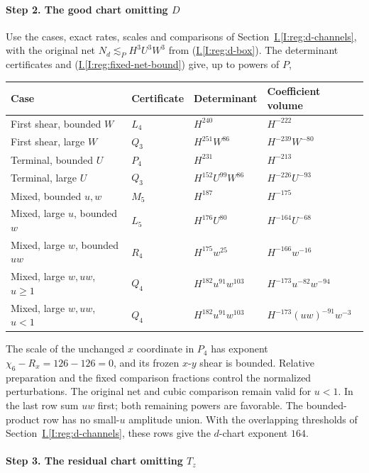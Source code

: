 \documentclass[11pt]{amsart}
\theoremstyle{definition}
\theoremstyle{remark}
\numberwithin{equation}{section}
\newcommand{\partIref}[1]{\hyperref[I:#1]{I.\ref*{I:#1}}}
\newcommand{\partIeqref}[1]{\textup{(\partIref{#1})}}
\begin{document}
\paragraph{Step 2. The good chart omitting \texorpdfstring{$D$}{D}}\label{low:6:s6r:dchart}

Use the cases, exact rates, scales and comparisons of Section~\partIref{reg:d-channels}, with the original net $N_d\lesssim_PH^3U^3W^3$ from \partIeqref{reg:d-box}. The determinant certificates and \partIeqref{reg:fixed-net-bound} give, up to powers of $P$,
\begin{center}\small
\begin{tabular}{llll}
\toprule
Case & Certificate & Determinant & Coefficient volume\\
\midrule
First shear, bounded $W$ & $L_4$ & $H^{240}$ & $H^{-222}$\\
First shear, large $W$ & $Q_3$ & $H^{251}W^{86}$ & $H^{-239}W^{-80}$\\
Terminal, bounded $U$ & $P_4$ & $H^{231}$ & $H^{-213}$\\
Terminal, large $U$ & $Q_3$ & $H^{152}U^{99}W^{86}$ & $H^{-226}U^{-93}$\\
Mixed, bounded $u,w$ & $M_5$ & $H^{187}$ & $H^{-175}$\\
Mixed, large $u$, bounded $w$ & $L_5$ & $H^{176}U^{80}$ & $H^{-164}U^{-68}$\\
Mixed, large $w$, bounded $uw$ & $R_4$ & $H^{175}w^{25}$ & $H^{-166}w^{-16}$\\
Mixed, large $w,uw$, $u\ge1$ & $Q_4$ & $H^{182}u^{91}w^{103}$ & $H^{-173}u^{-82}w^{-94}$\\
Mixed, large $w,uw$, $u<1$ & $Q_4$ & $H^{182}u^{91}w^{103}$ & $H^{-173}(uw)^{-91}w^{-3}$\\
\bottomrule
\end{tabular}
\end{center}

The scale of the unchanged $x$ coordinate in $P_4$ has exponent $\chi_6-R_x=126-126=0$, and its frozen $x$-$y$ shear is bounded. Relative preparation and the fixed comparison fractions control the normalized perturbations. The original net and cubic comparison remain valid for $u<1$. In the last row sum $uw$ first; both remaining powers are favorable. The bounded-product row has no small-$u$ amplitude union. With the overlapping thresholds of Section~\partIref{reg:d-channels}, these rows give the $d$-chart exponent $164$.

\paragraph{Step 3. The residual chart omitting \texorpdfstring{$T_z$}{Tz}}\label{low:6:s6r:fchart}
\end{document}
